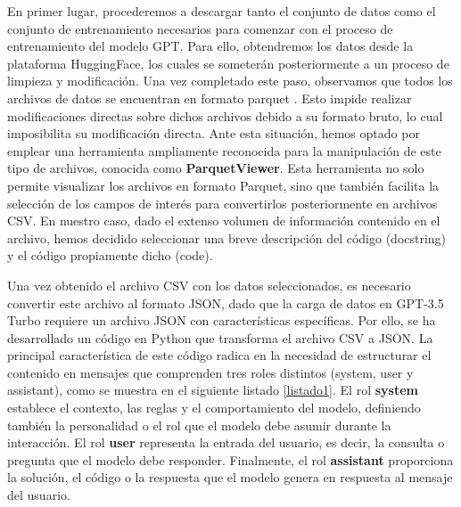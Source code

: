\bigskip %
En primer lugar, procederemos a descargar tanto el conjunto de datos como el conjunto de entrenamiento necesarios para comenzar con el proceso de entrenamiento del modelo \acrshort{GPT}. Para ello, obtendremos los datos desde la plataforma HuggingFace, los cuales se someterán posteriormente a un proceso de limpieza y modificación. Una vez completado este paso, observamos que todos los archivos de datos se encuentran en formato \gls{parquet} \cite{GobiernoEspana_Parquet}. Esto impide realizar modificaciones directas sobre dichos archivos debido a su formato bruto, lo cual imposibilita su modificación directa. Ante esta situación, hemos optado por emplear una herramienta ampliamente reconocida para la manipulación de este tipo de archivos, conocida como \textbf{ParquetViewer}. Esta herramienta no solo permite visualizar los archivos en formato Parquet, sino que también facilita la selección de los campos de interés para convertirlos posteriormente en archivos \acrshort{CSV}. En nuestro caso, dado el extenso volumen de información contenido en el archivo, hemos decidido seleccionar una breve descripción del código (docstring) y el código propiamente dicho (code).

\bigskip %

Una vez obtenido el archivo \acrshort{CSV} con los datos seleccionados, es necesario convertir este archivo al formato \acrshort{JSON}, dado que la carga de datos en \acrshort{GPT}-3.5 Turbo requiere un archivo \acrshort{JSON} con características específicas. Por ello, se ha desarrollado un código en Python que transforma el archivo \acrshort{CSV} a \acrshort{JSON}. La principal característica de este código radica en la necesidad de estructurar el contenido en mensajes que comprenden tres roles distintos (system, user y assistant), como se muestra en el siguiente listado \ref{listado1}. El rol \textbf{system} establece el contexto, las reglas y el comportamiento del modelo, definiendo también la personalidad o el rol que el modelo debe asumir durante la interacción. El rol \textbf{user} representa la entrada del usuario, es decir, la consulta o pregunta que el modelo debe responder. Finalmente, el rol \textbf{assistant} proporciona la solución, el código o la respuesta que el modelo genera en respuesta al mensaje del usuario.

\bigskip %


